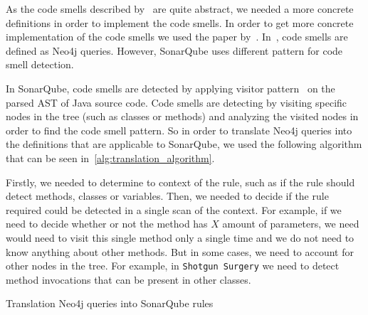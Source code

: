 As the code smells described by~\citeauthor{refactoring-fowler} are quite abstract, we needed
a more concrete definitions in order to implement the code smells.
In order to get more concrete implementation of the code smells we used the paper by~\citeauthor{ios_code_smell_paper}.
In~\cite{ios_code_smell_paper}, code smells are defined as Neo4j queries.
However, SonarQube uses different pattern for code smell detection.

In SonarQube, code smells are detected by applying visitor pattern~\cite{visitor_pattern} on the parsed
AST of Java source code.
Code smells are detecting by visiting specific nodes in the tree (such as classes or methods) and analyzing
the visited nodes in order to find the code smell pattern.
So in order to translate Neo4j queries into the definitions that are applicable to SonarQube, we used the following
algorithm that can be seen in~\ref{alg:translation_algorithm}.

Firstly, we needed to determine to context of the rule, such as if the rule should detect methods, classes or variables.
Then, we needed to decide if the rule required could be detected in a single scan of the context.
For example, if we need to decide whether or not the method has $X$ amount of parameters, we need would need to visit
this single method only a single time and we do not need to know anything about other methods.
But in some cases, we need to account for other nodes in the tree.
For example, in \verb|Shotgun Surgery| we need to detect method invocations that can be present in other classes.

\begin{algorithm} [!htb]
    \caption{Translation Neo4j queries into SonarQube rules}
    \label{alg:translation_algorithm}
    \BlankLine

\end{algorithm}

